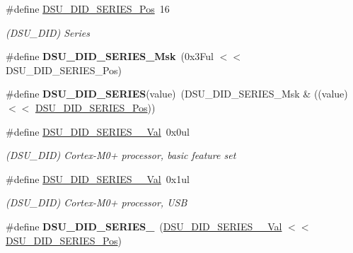 \begin{DoxyCompactItemize}
\item 
\hypertarget{group___s_a_m_l21___d_s_u_ga7f9f64f65c0ec3d507ba5bc03b1a9b68}{}\#define \hyperlink{group___s_a_m_l21___d_s_u_ga7f9f64f65c0ec3d507ba5bc03b1a9b68}{D\+S\+U\+\_\+\+D\+I\+D\+\_\+\+S\+E\+R\+I\+E\+S\+\_\+\+Pos}~16\label{group___s_a_m_l21___d_s_u_ga7f9f64f65c0ec3d507ba5bc03b1a9b68}

\begin{DoxyCompactList}\small\item\em (D\+S\+U\+\_\+\+D\+I\+D) Series \end{DoxyCompactList}\item 
\hypertarget{group___s_a_m_l21___d_s_u_gaf0a694364add4f49a3d7ad19af011e0b}{}\#define {\bfseries D\+S\+U\+\_\+\+D\+I\+D\+\_\+\+S\+E\+R\+I\+E\+S\+\_\+\+Msk}~(0x3\+Ful $<$$<$ D\+S\+U\+\_\+\+D\+I\+D\+\_\+\+S\+E\+R\+I\+E\+S\+\_\+\+Pos)\label{group___s_a_m_l21___d_s_u_gaf0a694364add4f49a3d7ad19af011e0b}

\item 
\hypertarget{group___s_a_m_l21___d_s_u_gaa8e2293c54c5435c7b90cc4ab8b0c91b}{}\#define {\bfseries D\+S\+U\+\_\+\+D\+I\+D\+\_\+\+S\+E\+R\+I\+E\+S}(value)~(D\+S\+U\+\_\+\+D\+I\+D\+\_\+\+S\+E\+R\+I\+E\+S\+\_\+\+Msk \& ((value) $<$$<$ \hyperlink{group___s_a_m_l21___d_s_u_ga7f9f64f65c0ec3d507ba5bc03b1a9b68}{D\+S\+U\+\_\+\+D\+I\+D\+\_\+\+S\+E\+R\+I\+E\+S\+\_\+\+Pos}))\label{group___s_a_m_l21___d_s_u_gaa8e2293c54c5435c7b90cc4ab8b0c91b}

\item 
\hypertarget{group___s_a_m_l21___d_s_u_gaa55d2175bbc40ac9d81bd297a4241916}{}\#define \hyperlink{group___s_a_m_l21___d_s_u_gaa55d2175bbc40ac9d81bd297a4241916}{D\+S\+U\+\_\+\+D\+I\+D\+\_\+\+S\+E\+R\+I\+E\+S\+\_\+\_\+\+Val}~0x0ul\label{group___s_a_m_l21___d_s_u_gaa55d2175bbc40ac9d81bd297a4241916}

\begin{DoxyCompactList}\small\item\em (D\+S\+U\+\_\+\+D\+I\+D) Cortex-\/\+M0+ processor, basic feature set \end{DoxyCompactList}\item 
\hypertarget{group___s_a_m_l21___d_s_u_ga5b1ab97381d29e6d852f6ef0aec8f479}{}\#define \hyperlink{group___s_a_m_l21___d_s_u_ga5b1ab97381d29e6d852f6ef0aec8f479}{D\+S\+U\+\_\+\+D\+I\+D\+\_\+\+S\+E\+R\+I\+E\+S\+\_\+\_\+\+Val}~0x1ul\label{group___s_a_m_l21___d_s_u_ga5b1ab97381d29e6d852f6ef0aec8f479}

\begin{DoxyCompactList}\small\item\em (D\+S\+U\+\_\+\+D\+I\+D) Cortex-\/\+M0+ processor, U\+S\+B \end{DoxyCompactList}\item 
\hypertarget{group___s_a_m_l21___d_s_u_gad25a0fe0a4a9ee82609243db4147eaeb}{}\#define {\bfseries D\+S\+U\+\_\+\+D\+I\+D\+\_\+\+S\+E\+R\+I\+E\+S\+\_}~(\hyperlink{group___s_a_m_l21___d_s_u_gaa55d2175bbc40ac9d81bd297a4241916}{D\+S\+U\+\_\+\+D\+I\+D\+\_\+\+S\+E\+R\+I\+E\+S\+\_\+\_\+\+Val}          $<$$<$ \hyperlink{group___s_a_m_l21___d_s_u_ga7f9f64f65c0ec3d507ba5bc03b1a9b68}{D\+S\+U\+\_\+\+D\+I\+D\+\_\+\+S\+E\+R\+I\+E\+S\+\_\+\+Pos})\label{group___s_a_m_l21___d_s_u_gad25a0fe0a4a9ee82609243db4147eaeb}


\end{DoxyCompactItemize}
